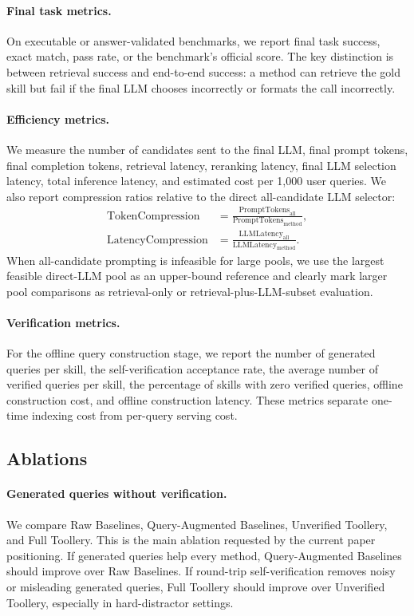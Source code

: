\documentclass[11pt]{article}
\begin{document}
\paragraph{Final task metrics.}
On executable or answer-validated benchmarks, we report final task success,
exact match, pass rate, or the benchmark's official score. The key distinction is
between retrieval success and end-to-end success: a method can retrieve the gold
skill but fail if the final LLM chooses incorrectly or formats the call
incorrectly.

\paragraph{Efficiency metrics.}
We measure the number of candidates sent to the final LLM, final prompt tokens,
final completion tokens, retrieval latency, reranking latency, final LLM
selection latency, total inference latency, and estimated cost per 1,000 user
queries. We also report compression ratios relative to the direct all-candidate
LLM selector:
\begin{align}
\mathrm{TokenCompression}
&= \frac{\mathrm{PromptTokens}_{\mathrm{all}}}
{\mathrm{PromptTokens}_{\mathrm{method}}}, \\
\mathrm{LatencyCompression}
&= \frac{\mathrm{LLMLatency}_{\mathrm{all}}}
{\mathrm{LLMLatency}_{\mathrm{method}}}.
\end{align}
When all-candidate prompting is infeasible for large pools, we use the largest
feasible direct-LLM pool as an upper-bound reference and clearly mark larger
pool comparisons as retrieval-only or retrieval-plus-LLM-subset evaluation.

\paragraph{Verification metrics.}
For the offline query construction stage, we report the number of generated
queries per skill, the self-verification acceptance rate, the average number of
verified queries per skill, the percentage of skills with zero verified queries,
offline construction cost, and offline construction latency. These metrics
separate one-time indexing cost from per-query serving cost.

\subsection{Ablations}
\label{subsec:ablations}

\paragraph{Generated queries without verification.}
We compare Raw Baselines, Query-Augmented Baselines, Unverified Toollery, and
Full Toollery. This is the main ablation requested by the current paper
positioning. If generated queries help every method, Query-Augmented Baselines
should improve over Raw Baselines. If round-trip self-verification removes noisy
or misleading generated queries, Full Toollery should improve over Unverified
Toollery, especially in hard-distractor settings.
\end{document}
